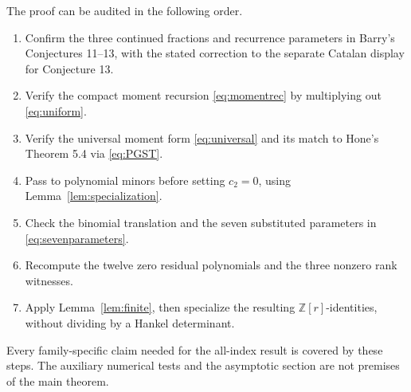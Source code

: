 \documentclass[11pt,letterpaper]{article}
\numberwithin{equation}{section}
\theoremstyle{definition}
\newcommand{\Z}{\mathbb Z}
\begin{document}
The proof can be audited in the following order.
\begin{enumerate}[leftmargin=2em,itemsep=3pt]
\item Confirm the three continued fractions and recurrence parameters in
Barry's Conjectures 11--13, with the stated correction to the separate
Catalan display for Conjecture 13.
\item Verify the compact moment recursion \eqref{eq:momentrec} by multiplying
out \eqref{eq:uniform}.
\item Verify the universal moment form \eqref{eq:universal} and its match to
Hone's Theorem 5.4 via \eqref{eq:PGST}.
\item Pass to polynomial minors before setting \(c_2=0\), using
Lemma~\ref{lem:specialization}.
\item Check the binomial translation and the seven substituted parameters
in \eqref{eq:sevenparameters}.
\item Recompute the twelve zero residual polynomials and the three nonzero
rank witnesses.
\item Apply Lemma~\ref{lem:finite}, then specialize the resulting
\(\Z[r]\)-identities, without dividing by a Hankel determinant.
\end{enumerate}
Every family-specific claim needed for the all-index result is covered by
these steps. The auxiliary numerical tests and the asymptotic section are
not premises of the main theorem.
\end{document}
